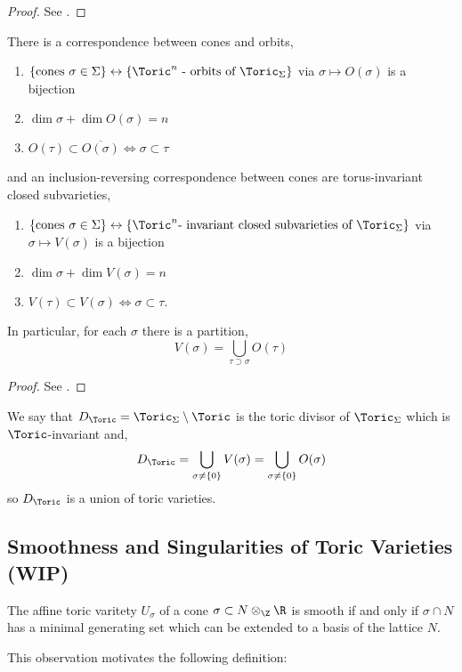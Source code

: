 \begin{proof}
See \cite[Lec. 2]{cox_lectures}.
\end{proof}

\begin{theorem}
There is a correspondence between cones and orbits,
\begin{enumerate}
\item $\{ \text{cones } \sigma \in \Sigma \} \leftrightarrow \{ \Toric^n \text{ - orbits of } \Toric_\Sigma \}$ via $\sigma \mapsto O(\sigma)$ is a bijection
\item $\dim{\sigma} + \dim{O(\sigma)} = n$
\item $O(\tau) \subset \overline{O(\sigma)} \iff \sigma \subset \tau$
\end{enumerate}
and an inclusion-reversing correspondence between cones are torus-invariant closed subvarieties,
\begin{enumerate}
\item $\{ \text{cones } \sigma \in \Sigma \} \leftrightarrow \{ \Toric^n \text{- invariant closed subvarieties of } \Toric_\Sigma \}$ via $\sigma \mapsto V(\sigma)$ is a bijection
\item $\dim{\sigma} + \dim{V(\sigma)} = n$
\item $V(\tau) \subset V(\sigma) \iff \sigma \subset \tau$.
\end{enumerate}
In particular, for each $\sigma$ there is a partition,
\[ V(\sigma) = \bigcup_{\tau \supset \sigma} O(\tau) \]
\end{theorem}

\begin{proof}
See \cite[Lec. 2]{cox_lectures}.
\end{proof}

\begin{rmk}
We say that $D_\Toric = \Toric_\Sigma \setminus \Toric$ is the toric divisor of $\Toric_\Sigma$ which is $\Toric$-invariant and,
\[ D_\Toric = \bigcup_{\sigma \neq \{0\}} V(\sigma) = \bigcup_{\sigma \neq \{0\}} O(\sigma) \]
so $D_\Toric$ is a union of toric varieties.
\end{rmk}


\subsection{Smoothness and Singularities of Toric Varieties (WIP)}

\begin{lemma}
The affine toric varitety $U_\sigma$ of a cone $\sigma \subset N \otimes_\Z \R$ is smooth if and only if $\sigma \cap N$ has a minimal generating set which can be extended to a basis of the lattice $N$.
\end{lemma}
\noindent
This observation motivates the following definition:

